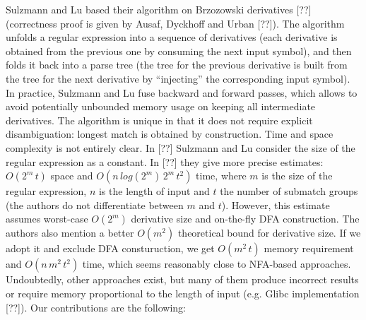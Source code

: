 \documentclass[AMA,STIX1COL]{WileyNJD-v2}
\begin{document}
Sulzmann and Lu based their algorithm on Brzozowski derivatives [??]
(correctness proof is given by Ausaf, Dyckhoff and Urban [??]).
The algorithm unfolds a regular expression into a sequence of derivatives
(each derivative is obtained from the previous one by consuming the next input symbol),
and then folds it back into a parse tree
(the tree for the previous derivative is built from the tree for the next derivative by ``injecting'' the corresponding input symbol).
In practice, Sulzmann and Lu fuse backward and forward passes,
which allows to avoid potentially unbounded memory usage on keeping all intermediate derivatives.
The algorithm is unique in that it does not require explicit disambiguation: longest match is obtained by construction.
Time and space complexity is not entirely clear.
In [??] Sulzmann and Lu consider the size of the regular expression as a constant.
In [??] they give more precise estimates: $O(2^m \, t)$ space and $O(n \, log(2^m) \, 2^m \, t^2)$ time,
where $m$ is the size of the regular expression,
$n$ is the length of input
and $t$ the number of submatch groups (the authors do not differentiate between $m$ and $t$).
However, this estimate assumes worst-case $O(2^m)$ derivative size and on-the-fly DFA construction.
The authors also mention a better $O(m^2)$ theoretical bound for derivative size.
If we adopt it and exclude DFA consturuction, we get $O(m^2 \, t)$ memory requirement and $O(n \, m^2 \, t^2)$ time,
which seems reasonably close to NFA-based approaches.
\\

Undoubtedly, other approaches exist,
but many of them produce incorrect results or require memory proportional to the length of input
(e.g. Glibc implementation [??]).
%
Our contributions are the following:
\\[-0.5em]
\end{document}
